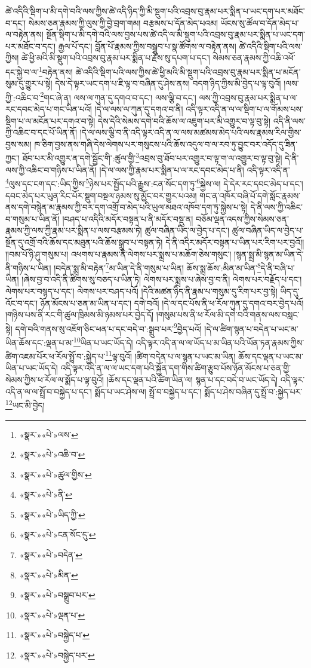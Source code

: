ཚེ་འདིའི་སྡིག་པ་མི་དགེ་བའི་ལས་ཀྱིས་ཚེ་འདི་ཉིད་ཀྱི་མི་སྡུག་པའི་འབྲས་བུ་རྣམ་པར་སྨིན་པ་ཡང་དག་པར་མཐོང་བ་དང་། སེམས་ཅན་རྣམས་ཀྱི་ལུས་ཀྱི་བྱེ་བྲག་གམ། བརྩམས་པ་དོན་མེད་པའམ། ཡོངས་སུ་ཚོལ་བ་དོན་མེད་པ་ལ་བརྟེན་ནས། སྔོན་སྡིག་པ་མི་དགེ་བའི་ལས་བྱས་པས་ཚེ་འདི་ལ་མི་སྡུག་པའི་འབྲས་བུ་རྣམ་པར་སྨིན་པ་ཡང་དག་པར་མཐོང་བ་དང་། རྒྱལ་པོ་དང་། བློན་པོ་རྣམས་ཀྱིས་བསྒྲུབ་པ་སྣ་ཚོགས་ལ་བརྟེན་ནས། ཚེ་འདིའི་སྡིག་པའི་ལས་ཀྱིས། ཚེ་ཕྱི་མའི་མི་སྡུག་པའི་འབྲས་བུ་རྣམ་པར་སྨིན་པ་རྗེས་སུ་དཔག་པ་དང་། སེམས་ཅན་རྣམས་ཀྱི་འཆི་འཕོ་དང་སྐྱེ་བ་ལ་\footnote{«སྣར་»«པེ་»ལས་}བརྟེན་ནས། ཚེ་འདིའི་སྡིག་པའི་ལས་ཀྱིས་ཚེ་ཕྱི་མའི་མི་སྡུག་པའི་འབྲས་བུ་རྣམ་པར་སྨིན་པ་མངོན་སུམ་དུ་གྱུར་པ་སྟེ། དེས་དེ་ལྟར་ཡང་དག་པ་ཇི་ལྟ་བ་བཞིན་དུ་ཤེས་ནས། བདག་ཉིད་ཀྱིས་མི་བྱེད་པ་ལྟ་བུའོ། །ལས་ཀྱི་:འཆིང་བ་\footnote{«སྣར་»«པེ་»འཆི་བ་}གང་ཞེ་ན། ལས་ལ་ཀུན་དུ་དགའ་བ་དང་། ལས་ལྕི་བ་དང་། ལས་ཀྱི་འབྲས་བུ་རྣམ་པར་སྨིན་པ་ལ་རང་དབང་མེད་པ་གང་ཡིན་པའོ། །དེ་ལ་ལས་ལ་ཀུན་དུ་དགའ་བ་ནི། འདི་ལྟར་འདི་ན་ལ་ལ་སྡིག་པ་ལ་གོམས་པས་སྡིག་པ་ལ་མངོན་པར་དགའ་བ་སྟེ། དེས་དེའི་སེམས་དགེ་བའི་ཆོས་ལ་འཇུག་པར་མི་འགྱུར་བ་ལྟ་བུ་སྟེ། འདི་ནི་ལས་ཀྱི་འཆིང་བ་དང་པོ་ཡིན་ནོ། །དེ་ལ་ལས་ལྕི་བ་ནི་འདི་ལྟར་འདི་ན་ལ་ལས་མཚམས་མེད་པའི་ལས་རྣམས་རིལ་གྱིས་བྱས་སམ། ཁ་ཅིག་བྱས་ནས་གཞི་དེས་ལེགས་པར་གསུངས་པའི་ཆོས་འདུལ་བ་ལ་རབ་ཏུ་བྱུང་བར་འདོད་དུ་ཟིན་ཀྱང་། ཐོབ་པར་མི་འགྱུར་ན་དགེ་སྦྱོང་གི་:ཚུལ་གྱི་\footnote{«སྣར་»«པེ་»ཚུལ་གྱིས་}འབྲས་བུ་ཐོབ་པར་འགྱུར་བ་ལྟ་ག་ལ་འགྱུར་བ་ལྟ་བུ་སྟེ། དེ་ནི་ལས་ཀྱི་འཆིང་བ་གཉིས་པ་ཡིན་ནོ། །དེ་ལ་ལས་ཀྱི་རྣམ་པར་སྨིན་པ་ལ་རང་དབང་མེད་པ་ནི། འདི་ལྟར་འདི་ན་\footnote{«སྣར་»«པེ་»ནི་}ལུས་དང་ངག་དང་:ཡིད་ཀྱིས་\footnote{«སྣར་»«པེ་»ཡིད་ཀྱི་}ཉེས་པར་སྤྱོད་པའི་རྒྱུས་:ངན་སོང་དག་ཏུ་\footnote{«སྣར་»«པེ་»ངན་སོང་དུ་}སྐྱེས་ལ། དེ་དེར་རང་དབང་མེད་པ་དང་། དབང་མེད་པར་ཡུན་རིང་པོར་སྡུག་བསྔལ་ཉམས་སུ་མྱོང་བར་གྱུར་པའམ། གང་ན་འཁོར་བཞི་པོ་དགེ་སློང་རྣམས་ནས་དགེ་བསྙེན་མ་རྣམས་ཀྱི་བར་དག་འགྲོ་བ་མེད་པའི་ཡུལ་མཐའ་འཁོབ་དག་ཏུ་སྐྱེས་པ་སྟེ། དེ་ནི་ལས་ཀྱི་འཆིང་བ་གསུམ་པ་ཡིན་ནོ། །བཤད་པ་འདིའི་མདོར་བསྟན་པ་ནི་མདོར་བསྡུ་ན། བཅོམ་ལྡན་འདས་ཀྱིས་སེམས་ཅན་རྣམས་ཀྱི་ལས་ཀྱི་རྣམ་པར་སྨིན་པ་ལས་བརྩམས་ཏེ། ཚུལ་བཞིན་ཡིད་ལ་བྱེད་པ་དང་། ཚུལ་བཞིན་ཡིད་ལ་བྱེད་པ་སྔོན་དུ་འགྲོ་བའི་ཆོས་དང་མཐུན་པའི་ཆོས་སྒྲུབ་པ་བསྟན་ཏེ། དེ་ནི་འདིར་མདོར་བསྟན་པ་ཡིན་པར་རིག་པར་བྱའོ།། །།བམ་པོ་ཉི་ཤུ་གསུམ་པ། འཕགས་པ་རྣམས་ནི་ལེགས་པར་སྨྲས་པ་མཆོག་ཅེས་གསུང་། །སྙན་སྨྲ་མི་སྙན་མ་ཡིན་དེ་ནི་གཉིས་པ་ཡིན། །བདེན་སྨྲ་མི་བརྟེན་\footnote{«སྣར་»«པེ་»བདེན་}མ་ཡིན་དེ་ནི་གསུམ་པ་ཡིན། ཆོས་སྨྲ་ཆོས་:མིན་མ་ཡིན་\footnote{«སྣར་»«པེ་»མིན་}དེ་ནི་བཞི་པ་ཡིན། །ཞེས་བྱ་བ་འདི་ནི་ཚིགས་སུ་བཅད་པ་ཡིན་ཏེ། ལེགས་པར་སྨྲས་པ་ཞེས་བྱ་བ་ནི། ལེགས་པར་བརྗོད་པ་དང་། ལེགས་པར་བསྙད་པ་དང་། ལེགས་པར་བཤད་པའོ། །དེའི་མཚན་ཉིད་ནི་རྣམ་པ་གསུམ་དུ་རིག་པར་བྱ་སྟེ། ཡིད་དུ་འོང་བ་དང་། ཉོན་མོངས་པ་ཅན་མ་ཡིན་པ་དང་། དགེ་བའོ། །དེ་ལ་དང་པོས་ནི་ཕ་རོལ་ཀུན་དུ་དགའ་བར་བྱེད་པའོ། །གཉིས་པས་ནི་རང་གི་ཚུལ་ཁྲིམས་མི་ཉམས་པར་བྱེད་དོ། །གསུམ་པས་ནི་ཕ་རོལ་མི་དགེ་བའི་གནས་ལས་བསླང་སྟེ། དགེ་བའི་གནས་སུ་འཇོག་ཅིང་ཕན་པ་དང་བདེ་བ་:སྒྲུབ་པར་\footnote{«སྣར་»«པེ་»བསྒྲུབ་པར་}བྱེད་པའོ། །དེ་ལ་ཚིག་སྙན་པ་བདེན་པ་ཡང་མ་ཡིན་ཆོས་དང་:ལྡན་པ་མ་\footnote{«སྣར་»«པེ་»ལྡན་པ་}ཡིན་པ་ཡང་ཡོད་དེ། འདི་ལྟར་འདི་ན་ལ་ལ་ཡོད་པ་མ་ཡིན་པའི་ཡོན་ཏན་རྣམས་ཀྱིས་ཚིག་འཇམ་པོར་ཕ་རོལ་སྤྲོ་བ་:སྐྱེད་པ་\footnote{«སྣར་»«པེ་»བསྐྱེད་པ་}ལྟ་བུའོ། །ཚིག་བདེན་པ་ལ་སྙན་པ་ཡང་མ་ཡིན། ཆོས་དང་ལྡན་པ་ཡང་མ་ཡིན་པ་ཡང་ཡོད་དེ། འདི་ལྟར་འདི་ན་ལ་ལ་ཡང་དག་པའི་སྐྱོན་དག་གིས་ཚིག་རྩུབ་པོས་ཉོན་མོངས་པ་ཅན་གྱི་སེམས་ཀྱིས་ཕ་རོལ་ལ་སྨོད་པ་ལྟ་བུའོ། །ཆོས་དང་ལྡན་པའི་ཚིག་ཡིན་ལ། སྙན་པ་དང་བདེ་བ་ཡང་ཡོད་དེ། འདི་ལྟར་འདི་ན་ལ་ལ་སྤྲོ་བ་བསྐྱེད་པ་དང་། སྨོད་པ་ཡང་ཤེས་ལ། སྤྲོ་བ་བསྐྱེད་པ་དང་། སྨོད་པ་ཤེས་བཞིན་དུ་སྤྲོ་བ་:སྐྱེད་པར་\footnote{«སྣར་»«པེ་»བསྐྱེད་པར་}ཡང་མི་བྱེད། 